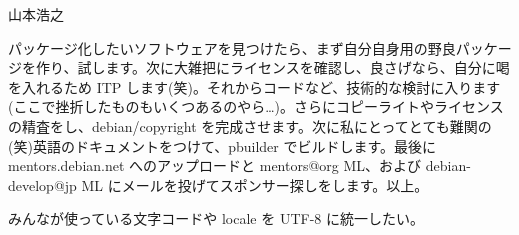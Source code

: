 \begin{prework}{山本浩之}

パッケージ化したいソフトウェアを見つけたら、まず自分自身用の野良パッケージを作り、試します。次に大雑把にライセンスを確認し、良さげなら、自分に喝を入れるため ITP します(笑)。それからコードなど、技術的な検討に入ります (ここで挫折したものもいくつあるのやら…)。さらにコピーライトやライセンスの精査をし、debian/copyright を完成させます。次に私にとってとても難関の(笑)英語のドキュメントをつけて、pbuilder でビルドします。最後に mentors.debian.net へのアップロードと mentors@org ML、および debian-develop@jp ML にメールを投げてスポンサー探しをします。以上。


みんなが使っている文字コードや locale を UTF-8 に統一したい。

\end{prework}

